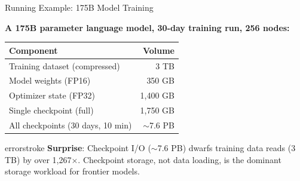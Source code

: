 \documentclass[aspectratio=169, 12pt]{beamer}
\begin{document}
\begin{frame}{Running Example: 175B Model Training}

\small
\textbf{A 175B parameter language model, 30-day training run, 256 nodes:}

\vspace{0.1cm}
\renewcommand{\arraystretch}{1.15}
{\footnotesize
\begin{tabular}{@{}lr@{}}
  \toprule
  \textbf{Component} & \textbf{Volume} \\
  \midrule
  Training dataset (compressed)         & 3 TB \\
  Model weights (FP16)                  & 350 GB \\
  Optimizer state (FP32)                & 1,400 GB \\
  Single checkpoint (full)              & 1,750 GB \\
  All checkpoints (30 days, 10 min)     & $\sim$7.6 PB \\
  \bottomrule
\end{tabular}
}

\vspace{0.2cm}
\begin{mlsyscard}{errorstroke}
{\footnotesize \textbf{Surprise}: Checkpoint I/O ($\sim$7.6 PB) dwarfs training data reads (3 TB) by over 1,267$\times$. Checkpoint storage, not data loading, is the dominant storage workload for frontier models.}
\end{mlsyscard}

\end{frame}

\end{document}
